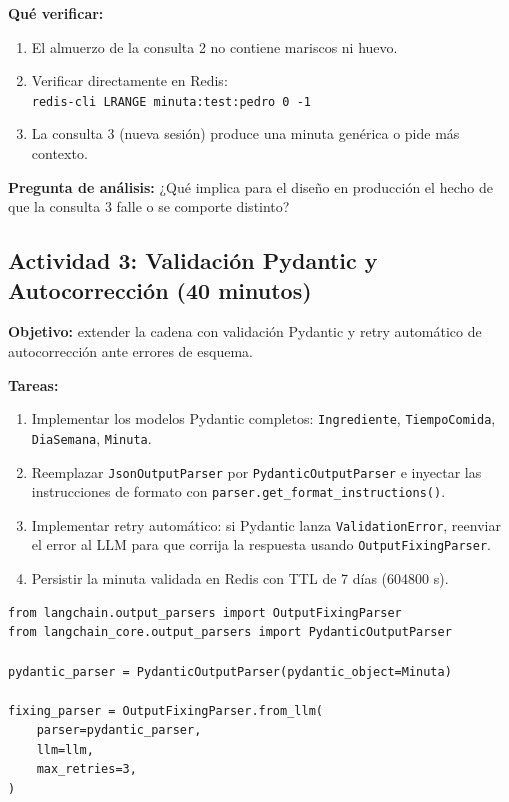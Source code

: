\documentclass[12pt,a4paper]{article}
\begin{document}
\textbf{Qué verificar:}
\begin{enumerate}
  \item El almuerzo de la consulta 2 no contiene mariscos ni huevo.
  \item Verificar directamente en Redis: \\
    \texttt{redis-cli LRANGE minuta:test:pedro 0 -1}
  \item La consulta 3 (nueva sesión) produce una minuta genérica o pide más contexto.
\end{enumerate}

\textbf{Pregunta de análisis:} ¿Qué implica para el diseño en producción
el hecho de que la consulta 3 falle o se comporte distinto?

\subsection{Actividad 3: Validación Pydantic y Autocorrección (40 minutos)}

\textbf{Objetivo:} extender la cadena con validación Pydantic y retry
automático de autocorrección ante errores de esquema.

\textbf{Tareas:}
\begin{enumerate}
  \item Implementar los modelos Pydantic completos:
    \texttt{Ingrediente}, \texttt{TiempoComida}, \texttt{DiaSemana},
    \texttt{Minuta}.
  \item Reemplazar \texttt{JsonOutputParser} por \texttt{PydanticOutputParser}
    e inyectar las instrucciones de formato con
    \texttt{parser.get\_format\_instructions()}.
  \item Implementar retry automático: si Pydantic lanza
    \texttt{ValidationError}, reenviar el error al LLM para que corrija
    la respuesta usando \texttt{OutputFixingParser}.
  \item Persistir la minuta validada en Redis con TTL de 7 días (604800 s).
\end{enumerate}

\begin{lstlisting}[style=pythonstyle, caption={Hint: OutputFixingParser para autocorrección}]
from langchain.output_parsers import OutputFixingParser
from langchain_core.output_parsers import PydanticOutputParser

pydantic_parser = PydanticOutputParser(pydantic_object=Minuta)

fixing_parser = OutputFixingParser.from_llm(
    parser=pydantic_parser,
    llm=llm,
    max_retries=3,
)
\end{lstlisting}
\end{document}
